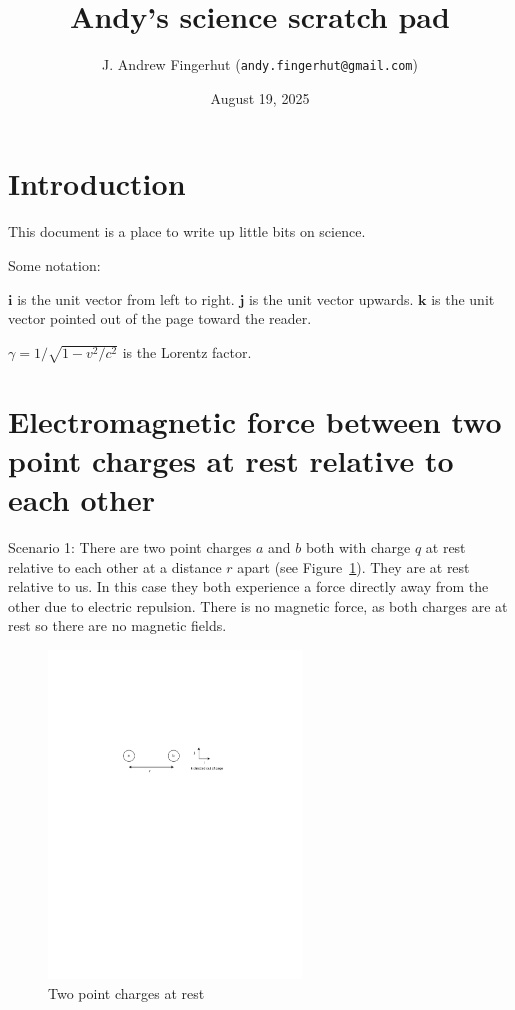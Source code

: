 \documentclass[a4paper]{article}
\title{Andy's science scratch pad}
\author{J. Andrew Fingerhut (\texttt{andy.fingerhut@gmail.com})}
\date{
        August 19, 2025
}
\theoremstyle{plain}
\theoremstyle{definition}
\newcommand{\ihat}{\mathbf{i}}
\newcommand{\jhat}{\mathbf{j}}
\newcommand{\khat}{\mathbf{k}}
\begin{document}
\maketitle


\tableofcontents

\section{Introduction}
\label{sec:intro}

This document is a place to write up little bits on science.

Some notation:

$\ihat$ is the unit vector from left to right.
$\jhat$ is the unit vector upwards.
$\khat$ is the unit vector pointed out of the page toward the reader.

$\gamma = 1/\sqrt{1-v^2/c^2}$ is the Lorentz factor.


\section{Electromagnetic force between two point charges at rest relative to each other}
\label{sec:twocharges}

Scenario 1: There are two point charges $a$ and $b$ both with charge
$q$ at rest relative to each other at a distance $r$ apart (see
Figure~\ref{fig:two-charges-at-rest}).  They are at rest relative
to us.  In this case they both experience a force directly away from
the other due to electric repulsion.  There is no magnetic force, as
both charges are at rest so there are no magnetic fields.

\begin{figure}[ht]
	\centering
	\includegraphics[width=0.6\textwidth]{two-charges-at-rest-cropped.pdf}
	\caption{Two point charges at rest}
	\label{fig:two-charges-at-rest}
\end{figure}
\end{document}
